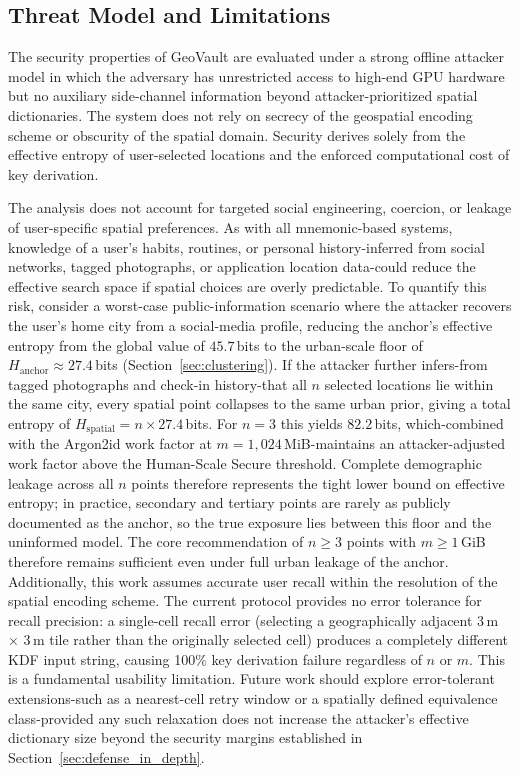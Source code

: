 \documentclass[journal,article,submit,pdftex,moreauthors]{Definitions/mdpi}
\newcommand{\add}[1]{#1}
\newcommand{\remove}[1]{}
\newcommand{\add}[1]{\added{#1}}
\newcommand{\remove}[1]{\deleted{#1}}
\begin{document}
\subsection{Threat Model and Limitations}

The security properties of GeoVault are evaluated under a strong offline attacker model in which the adversary has unrestricted access to high-end GPU hardware but no auxiliary side-channel information beyond attacker-prioritized spatial dictionaries. The system does not rely on secrecy of the geospatial encoding scheme or obscurity of the spatial domain. Security derives solely from the effective entropy of user-selected locations and the enforced computational cost of key derivation.

The analysis does not account for targeted social engineering, coercion, or leakage of user-specific spatial preferences. As with all mnemonic-based systems, knowledge of a user's habits, routines, or personal history-inferred from social networks, tagged photographs, or application location data-could reduce the effective search space if spatial choices are overly predictable. \add{To quantify this risk, consider a worst-case public-information scenario where the attacker recovers the user's home city from a social-media profile, reducing the anchor's effective entropy from the global value of $45.7$\,bits to the urban-scale floor of $H_\text{anchor}\approx 27.4$\,bits (Section~\ref{sec:clustering}). If the attacker further infers-from tagged photographs and check-in history-that all $n$ selected locations lie within the same city, every spatial point collapses to the same urban prior, giving a total entropy of $H_\text{spatial} = n\times 27.4$\,bits. For $n=3$ this yields $82.2$\,bits, which-combined with the Argon2id work factor at $m=1{,}024$\,MiB-maintains an attacker-adjusted work factor above the Human-Scale Secure threshold. Complete demographic leakage across all $n$ points therefore represents the tight lower bound on effective entropy; in practice, secondary and tertiary points are rarely as publicly documented as the anchor, so the true exposure lies between this floor and the uninformed model. The core recommendation of $n\geq 3$ points with $m\geq 1$\,GiB therefore remains sufficient even under full urban leakage of the anchor.} Additionally, this work assumes accurate user recall within the resolution of the spatial encoding scheme. \remove{While tolerance buffers are incorporated into the entropy analysis, future implementations may benefit from explicit error-correction or fuzzy matching mechanisms to accommodate imperfect recall without expanding the attacker's advantage.}\add{The current protocol provides no error tolerance for recall precision: a single-cell recall error (selecting a geographically adjacent 3\,m $\times$ 3\,m tile rather than the originally selected cell) produces a completely different KDF input string, causing 100\% key derivation failure regardless of $n$ or $m$. This is a fundamental usability limitation. Future work should explore error-tolerant extensions-such as a nearest-cell retry window or a spatially defined equivalence class-provided any such relaxation does not increase the attacker's effective dictionary size beyond the security margins established in Section~\ref{sec:defense_in_depth}.}
\end{document}
